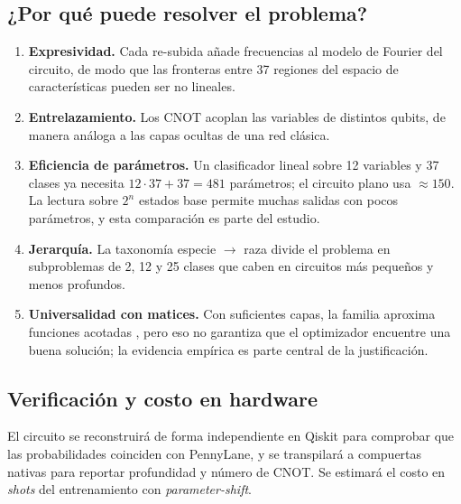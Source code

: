 \documentclass[11pt,letterpaper]{article}
\begin{document}
\subsection{¿Por qué puede resolver el problema?}
\begin{enumerate}[leftmargin=*]
\item \textbf{Expresividad.} Cada re-subida añade frecuencias al modelo de Fourier del circuito, de
modo que las fronteras entre 37 regiones del espacio de características pueden ser no lineales.
\item \textbf{Entrelazamiento.} Los CNOT acoplan las variables de distintos qubits, de manera análoga a
las capas ocultas de una red clásica.
\item \textbf{Eficiencia de parámetros.} Un clasificador lineal sobre 12 variables y 37 clases ya
necesita $12\cdot37+37=481$ parámetros; el circuito plano usa $\approx150$. La lectura sobre $2^n$
estados base permite muchas salidas con pocos parámetros, y esta comparación es parte del estudio.
\item \textbf{Jerarquía.} La taxonomía especie $\to$ raza divide el problema en subproblemas de 2, 12 y
25 clases que caben en circuitos más pequeños y menos profundos.
\item \textbf{Universalidad con matices.} Con suficientes capas, la familia aproxima funciones acotadas
\cite{perez2020}, pero eso no garantiza que el optimizador encuentre una buena solución; la evidencia
empírica es parte central de la justificación.
\end{enumerate}

\subsection{Verificación y costo en hardware}
El circuito se reconstruirá de forma independiente en Qiskit para comprobar que las probabilidades
coinciden con PennyLane, y se transpilará a compuertas nativas para reportar profundidad y número de
CNOT. Se estimará el costo en \emph{shots} del entrenamiento con \emph{parameter-shift}.

\end{document}
